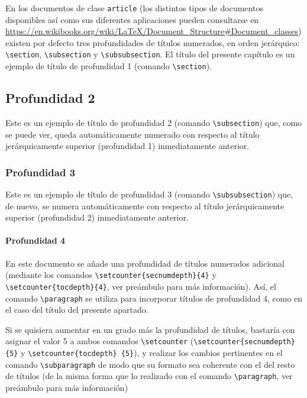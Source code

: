 \documentclass[a4paper, 11pt, spanish, twoside]{article}
\begin{document}
En los documentos de clase \texttt{article} (los distintos tipos de documentos disponibles así como sus diferentes aplicaciones pueden consultarse en \url{https://en.wikibooks.org/wiki/LaTeX/Document_Structure#Document_classes}) existen por defecto tres profundidades de títulos numerados, en orden jerárquico: \texttt{\textbackslash section}, \texttt{\textbackslash subsection} y \texttt{\textbackslash subsubsection}. El título del presente capítulo es un ejemplo de título de profundidad 1 (comando \texttt{\textbackslash section}).


\subsection{Profundidad 2}

Este es un ejemplo de título de profundidad 2 (comando \texttt{\textbackslash subsection}) que, como se puede ver, queda automáticamente numerado con respecto al título jerárquicamente superior (profundidad 1) inmediatamente anterior.


\subsubsection{Profundidad 3}

Este es un ejemplo de título de profundidad 3 (comando \texttt{\textbackslash subsubsection}) que, de nuevo, se numera automáticamente con respecto al título jerárquicamente superior (profundidad 2) inmediatamente anterior.


\paragraph{Profundidad 4}

En este documento se añade una profundidad de títulos numerados adicional (mediante los comandos \texttt{\textbackslash setcounter\{secnumdepth\}\{4\}} y \texttt{\textbackslash setcounter\{tocdepth\}\{4\}}, ver preámbulo para más información). Así, el comando \texttt{\textbackslash paragraph} se utiliza para incorporar títulos de profundidad 4, como en el caso del título del presente apartado. 

Si se quisiera aumentar en un grado más la profundidad de títulos, bastaría con asignar el valor 5 a ambos comandos \texttt{\textbackslash setcounter} (\texttt{\textbackslash setcounter\{secnumdepth\}\{5\}} y \texttt{\textbackslash setcounter\{tocdepth\} \{5\}}), y realizar los cambios pertinentes en el comando \texttt{\textbackslash subparagraph} de modo que su formato sea coherente con el del resto de títulos (de la misma forma que lo realizado con el comando \texttt{\textbackslash paragraph}, ver preámbulo para más información)
\end{document}
